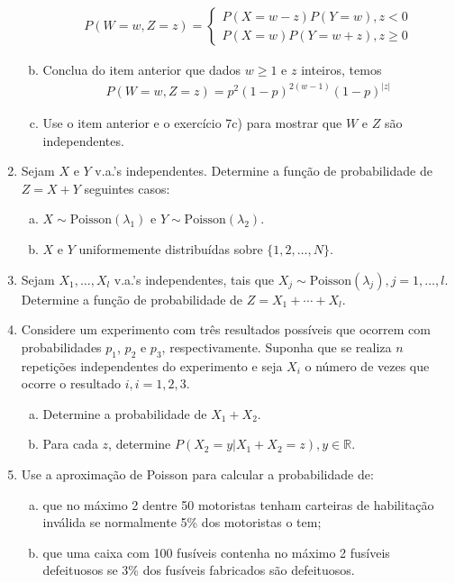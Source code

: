 \documentclass[../Notas.tex]{subfiles}
\begin{document}
\begin{enumerate}
\begin{enumerate}[a)]
    \begin{align*}
        P(W=w, Z=z) = \begin{cases}
        P(X = w-z)P(Y=w), z < 0 \\
        P(X=w)P(Y = w+z), z\geq 0
        \end{cases}
    \end{align*}
    \item Conclua do item anterior que dados $w\geq 1$ e $z$ inteiros, temos
    \begin{align*}
        P(W=w, Z=z) = p^2(1-p)^{2(w-1)}(1-p)^{|z|}
    \end{align*}
    \item Use o item anterior e o exercício 7c) para mostrar que $W$ e $Z$ são independentes.
    \end{enumerate}
    \item Sejam $X$ e $Y$ v.a.’s independentes. Determine a função de probabilidade de $Z = X+Y$ seguintes casos:
    \begin{enumerate}[a)]
    \item $X\sim\text{Poisson}(\lambda_1)$ e $Y\sim\text{Poisson}(\lambda_2)$.
    \item $X$ e $Y$ uniformemente distribuídas sobre $\{1, 2, \dots, N\}$.
    \end{enumerate}
    \item Sejam $X_1, \dots, X_l$ v.a.’s independentes, tais que $X_j\sim\text{Poisson}(\lambda_j), j=1, \dots, l$. Determine a função de probabilidade de $Z = X_1 + \cdots + X_l$.
    \item Considere um experimento com três resultados possíveis que ocorrem com probabilidades $p_1$, $p_2$ e $p_3$, respectivamente. Suponha que se realiza $n$ repetições independentes do experimento e seja $X_i$ o número de vezes que ocorre o resultado $i, i =1, 2, 3$.
    \begin{enumerate}[a)]
    \item Determine a probabilidade de $X_1+X_2$.
    \item Para cada $z$, determine $P(X_2=y|X_1+X_2 = z), y\in\mathbb{R}$.
    \end{enumerate}
    \item Use a aproximação de Poisson para calcular a probabilidade de:
    \begin{enumerate}[a)]
    \item que no máximo 2 dentre 50 motoristas tenham carteiras de habilitação inválida se normalmente 5\% dos motoristas o tem;
    \item que uma caixa com 100 fusíveis contenha no máximo 2 fusíveis defeituosos se 3\% dos fusíveis fabricados são defeituosos.

\end{enumerate}
\end{enumerate}
\end{document}
